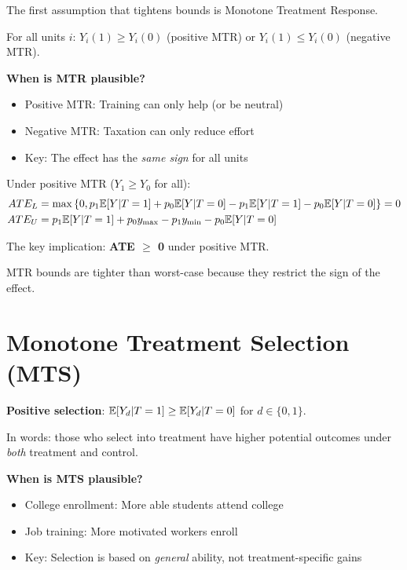 The first assumption that tightens bounds is Monotone Treatment Response.

\begin{assumption}
\label{ass:mtr}
For all units $i$: $Y_i(1) \geq Y_i(0)$ (positive MTR) or $Y_i(1) \leq Y_i(0)$ (negative MTR).
\end{assumption}

\textbf{When is MTR plausible?}
\begin{itemize}
    \item Positive MTR: Training can only help (or be neutral)
    \item Negative MTR: Taxation can only reduce effort
    \item Key: The effect has the \emph{same sign} for all units
\end{itemize}

\begin{theorem}
\label{thm:mtr_bounds}
Under positive MTR ($Y_1 \geq Y_0$ for all):
\begin{align*}
ATE_L &= \max\left\{0, p_1 \mathbb{E}[Y|T=1] + p_0 \mathbb{E}[Y|T=0] - p_1 \mathbb{E}[Y|T=1] - p_0 \mathbb{E}[Y|T=0]\right\} = 0 \\
ATE_U &= p_1 \mathbb{E}[Y|T=1] + p_0 y_{\max} - p_1 y_{\min} - p_0 \mathbb{E}[Y|T=0]
\end{align*}

The key implication: \textbf{ATE $\geq$ 0} under positive MTR.
\end{theorem}

MTR bounds are tighter than worst-case because they restrict the sign of the effect.


\section{Monotone Treatment Selection (MTS)}
\label{sec:manski_mts}

\begin{assumption}
\label{ass:mts}
\textbf{Positive selection}: $\mathbb{E}[Y_d | T = 1] \geq \mathbb{E}[Y_d | T = 0]$ for $d \in \{0, 1\}$.
\end{assumption}

In words: those who select into treatment have higher potential outcomes under \emph{both} treatment and control.

\textbf{When is MTS plausible?}
\begin{itemize}
    \item College enrollment: More able students attend college
    \item Job training: More motivated workers enroll
    \item Key: Selection is based on \emph{general} ability, not treatment-specific gains
\end{itemize}


